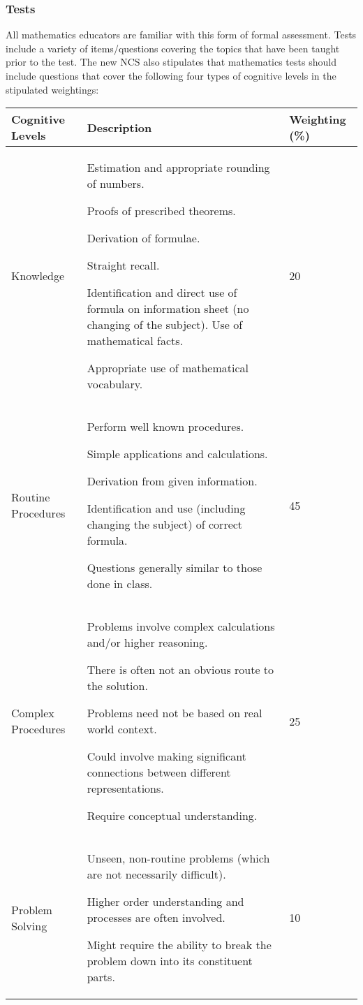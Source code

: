 \subsubsection{Tests}
All mathematics educators are familiar with this form of formal assessment. Tests include a variety of items/questions covering the topics that have been taught prior to the test. The new NCS also stipulates that mathematics tests should include questions that cover the following four types of cognitive levels in the stipulated weightings: 
\begin{table}[H]
\begin{center}
\begin{tabular} {|p{3cm}|p{7cm}|p{1.5cm}|} \hline
\textbf{Cognitive Levels} & \textbf{Description} & \textbf{Weighting (\%)} \\ \hline
Knowledge & 
Estimation and appropriate rounding of numbers. \par 
Proofs of prescribed theorems.\par 
Derivation of formulae.\par 
Straight recall.\par 
Identification and direct use of formula on information sheet (no changing of the subject).
Use of mathematical facts.\par 
Appropriate use of mathematical vocabulary. & 
20 \\ \hline

Routine Procedures & 
Perform well known procedures.\par 
Simple applications and calculations.\par 
Derivation from given information.\par 
Identification and use (including changing the subject) of correct formula.\par 
Questions generally similar to those done in class. &
45 \\ \hline
Complex Procedures &
Problems involve complex calculations and/or higher reasoning. \par 
There is often not an obvious route to the solution.\par 
Problems need not be based on real world context.\par 
Could involve making significant connections between different representations.\par 
Require conceptual understanding. &
25 \\ \hline
Problem Solving & 
Unseen, non-routine problems (which are not necessarily difficult). \par 
Higher order understanding and processes are often involved.\par 
Might require the ability to break the problem down into its constituent parts.&
10 \\ \hline

\end{tabular}
 \end{center}
\end{table}

